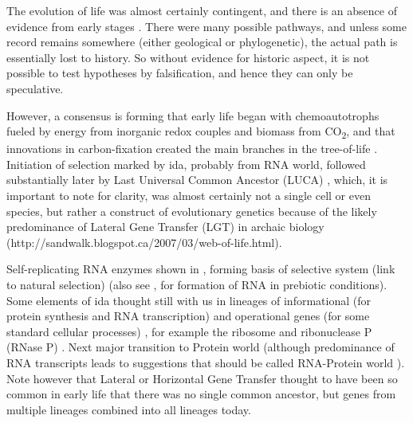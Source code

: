 \begin{mdframed}[style=box, frametitle={The orgins of life}]

The evolution of life was almost certainly contingent, and there is an absence of evidence from early stages \parencite{Pross2013}. There were many possible pathways, and unless some record remains somewhere (either geological or phylogenetic), the actual path is essentially lost to history. So without evidence for historic aspect, it is not possible to test hypotheses by falsification, and hence they can only be speculative.

However, a consensus is forming that early life began with chemoautotrophs fueled by energy from inorganic redox couples and biomass from CO\textsubscript{2}, and that innovations in carbon-fixation created the main branches in the tree-of-life \parencite{Braakman2012}. Initiation of selection marked by \gls{ida}, probably from RNA world, followed substantially later by Last Universal Common Ancestor (LUCA) \parencite{Yarus2011}, which, it is important to note for clarity, was almost certainly not a single cell or even species, but rather a construct of evolutionary genetics because of the likely predominance of Lateral Gene Transfer (LGT) in archaic biology (http://sandwalk.blogspot.ca/2007/03/web-of-life.html).

Self-replicating RNA enzymes shown in \parencite{Lincoln2009}, forming basis of selective system (link to natural selection) (also see \parencite{Cheng2010}, \parencite{Powner2009} for formation of RNA in prebiotic conditions). Some elements of \gls{ida} thought still with us in lineages of informational (for protein synthesis and RNA transcription) and operational genes (for some standard cellular processes) \parencite{Ragan2009}, for example the ribosome and ribonuclease P (RNase P) \parencite{Wilson2009}. Next major transition to Protein world (although predominance of RNA transcripts leads to suggestions that should be called RNA-Protein world \parencite{Altman2013}). Note however that Lateral or Horizontal Gene Transfer thought to have been so common in early life that there was no single common ancestor, but genes from multiple lineages combined into all lineages today.\parencite{Ragan2009}



\end{mdframed}
